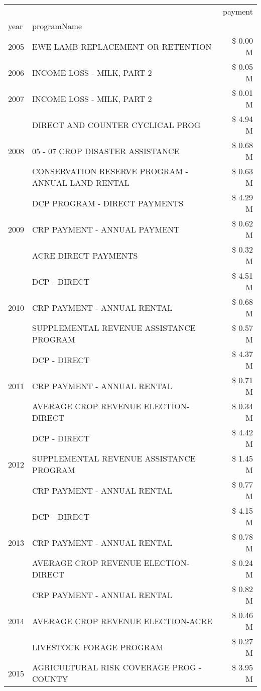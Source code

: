 \begin{tabular}{llr}
\toprule
 &  & payment \\
year & programName &  \\
\midrule
2005 & EWE LAMB REPLACEMENT OR RETENTION & \$ 0.00 M \\
\cline{1-3}
2006 & INCOME LOSS - MILK, PART 2 & \$ 0.05 M \\
\cline{1-3}
2007 & INCOME LOSS - MILK, PART 2 & \$ 0.01 M \\
\cline{1-3}
\multirow[t]{3}{*}{2008} & DIRECT AND COUNTER CYCLICAL PROG & \$ 4.94 M \\
 & 05 - 07 CROP DISASTER ASSISTANCE & \$ 0.68 M \\
 & CONSERVATION RESERVE PROGRAM - ANNUAL LAND RENTAL & \$ 0.63 M \\
\cline{1-3}
\multirow[t]{3}{*}{2009} & DCP PROGRAM - DIRECT PAYMENTS & \$ 4.29 M \\
 & CRP PAYMENT - ANNUAL PAYMENT & \$ 0.62 M \\
 & ACRE DIRECT PAYMENTS & \$ 0.32 M \\
\cline{1-3}
\multirow[t]{3}{*}{2010} & DCP - DIRECT & \$ 4.51 M \\
 & CRP PAYMENT - ANNUAL RENTAL & \$ 0.68 M \\
 & SUPPLEMENTAL REVENUE ASSISTANCE PROGRAM & \$ 0.57 M \\
\cline{1-3}
\multirow[t]{3}{*}{2011} & DCP - DIRECT & \$ 4.37 M \\
 & CRP PAYMENT - ANNUAL RENTAL & \$ 0.71 M \\
 & AVERAGE CROP REVENUE ELECTION-DIRECT & \$ 0.34 M \\
\cline{1-3}
\multirow[t]{3}{*}{2012} & DCP - DIRECT & \$ 4.42 M \\
 & SUPPLEMENTAL REVENUE ASSISTANCE PROGRAM & \$ 1.45 M \\
 & CRP PAYMENT - ANNUAL RENTAL & \$ 0.77 M \\
\cline{1-3}
\multirow[t]{3}{*}{2013} & DCP - DIRECT & \$ 4.15 M \\
 & CRP PAYMENT - ANNUAL RENTAL & \$ 0.78 M \\
 & AVERAGE CROP REVENUE ELECTION-DIRECT & \$ 0.24 M \\
\cline{1-3}
\multirow[t]{3}{*}{2014} & CRP PAYMENT - ANNUAL RENTAL & \$ 0.82 M \\
 & AVERAGE CROP REVENUE ELECTION-ACRE & \$ 0.46 M \\
 & LIVESTOCK FORAGE PROGRAM & \$ 0.27 M \\
\cline{1-3}
\multirow[t]{3}{*}{2015} & AGRICULTURAL RISK COVERAGE PROG - COUNTY & \$ 3.95 M \\

\end{tabular}
